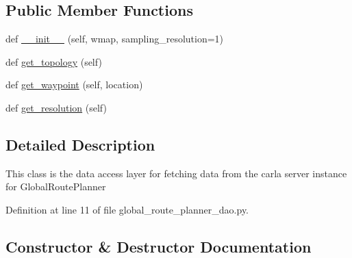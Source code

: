 \subsection*{Public Member Functions}
\begin{DoxyCompactItemize}
\item 
def \hyperlink{classscripts_1_1agents_1_1navigation_1_1global__route__planner__dao_1_1GlobalRoutePlannerDAO_aa6998a36f5e40b3ac35e11f526b910cb}{\+\_\+\+\_\+init\+\_\+\+\_\+} (self, wmap, sampling\+\_\+resolution=1)
\item 
def \hyperlink{classscripts_1_1agents_1_1navigation_1_1global__route__planner__dao_1_1GlobalRoutePlannerDAO_adc57ea46ad2f68901f15e8fb11d097e5}{get\+\_\+topology} (self)
\item 
def \hyperlink{classscripts_1_1agents_1_1navigation_1_1global__route__planner__dao_1_1GlobalRoutePlannerDAO_a30b1db1681843781913b551ea1bf0551}{get\+\_\+waypoint} (self, location)
\item 
def \hyperlink{classscripts_1_1agents_1_1navigation_1_1global__route__planner__dao_1_1GlobalRoutePlannerDAO_a40ee35519bc601af9469dcf0b5fe57f4}{get\+\_\+resolution} (self)
\end{DoxyCompactItemize}


\subsection{Detailed Description}
\begin{DoxyVerb}This class is the data access layer for fetching data
from the carla server instance for GlobalRoutePlanner
\end{DoxyVerb}
 

Definition at line 11 of file global\+\_\+route\+\_\+planner\+\_\+dao.\+py.



\subsection{Constructor \& Destructor Documentation}
\mbox{\label{classscripts_1_1agents_1_1navigation_1_1global__route__planner__dao_1_1GlobalRoutePlannerDAO_aa6998a36f5e40b3ac35e11f526b910cb}} 
